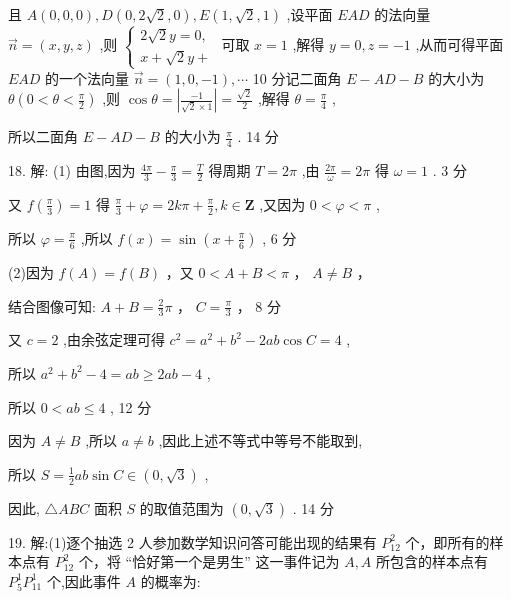 \documentclass[10pt]{article}
\begin{document}
且 \(A\left( {0,0,0}\right) ,D\left( {0,2\sqrt{2},0}\right) ,E\left( {1,\sqrt{2},1}\right)\) ,设平面 \({EAD}\) 的法向量 \(\overrightarrow{n} = \left( {x,y,z}\right)\) ,则 \(\left\{  \begin{array}{l} 2\sqrt{2}y = 0, \\  x + \sqrt{2}y +  \end{array}\right.\) 可取 \(x = 1\) ,解得 \(y = 0,z =  - 1\) ,从而可得平面 \({EAD}\) 的一个法向量 \(\overrightarrow{n} = \left( {1,0, - 1}\right) ,\cdots\) 10 分记二面角 \(E - {AD} - B\) 的大小为 \(\theta \left( {0 < \theta  < \frac{\pi }{2}}\right)\) ,则 \(\cos \theta  = \left| \frac{-1}{\sqrt{2} \times  1}\right|  = \frac{\sqrt{2}}{2}\) ,解得 \(\theta  = \frac{\pi }{4}\) ,

所以二面角 \(E - {AD} - B\) 的大小为 \(\frac{\pi }{4}\) . 14 分

18. 解: (1) 由图,因为 \(\frac{4\pi }{3} - \frac{\pi }{3} = \frac{T}{2}\) 得周期 \(T = {2\pi }\) ,由 \(\frac{2\pi }{\omega } = {2\pi }\) 得 \(\omega  = 1\) . 3 分

又 \(f\left( \frac{\pi }{3}\right)  = 1\) 得 \(\frac{\pi }{3} + \varphi  = {2k\pi } + \frac{\pi }{2},k \in  \mathbf{Z}\) ,又因为 \(0 < \varphi  < \pi\) ,

所以 \(\varphi  = \frac{\pi }{6}\) ,所以 \(f\left( x\right)  = \sin \left( {x + \frac{\pi }{6}}\right)\) , 6 分

(2)因为 \(f\left( A\right)  = f\left( B\right)\) ，又 \(0 < A + B < \pi\) ， \(A \neq  B\) ，

结合图像可知: \(A + B = \frac{2}{3}\pi\) ， \(C = \frac{\pi }{3}\) ， 8 分

又 \(c = 2\) ,由余弦定理可得 \({c}^{2} = {a}^{2} + {b}^{2} - {2ab}\cos C = 4\) ,

所以 \({a}^{2} + {b}^{2} - 4 = {ab} \geq  {2ab} - 4\) ,

所以 \(0 < {ab} \leq  4\) , 12 分

因为 \(A \neq  B\) ,所以 \(a \neq  b\) ,因此上述不等式中等号不能取到,

所以 \(S = \frac{1}{2}{ab}\sin C \in  \left( {0,\sqrt{3}}\right)\) ,

因此, \(\bigtriangleup {ABC}\) 面积 \(S\) 的取值范围为 \(\left( {0,\sqrt{3}}\right)\) . 14 分

19. 解:(1)逐个抽选 2 人参加数学知识问答可能出现的结果有 \({P}_{12}^{2}\) 个，即所有的样本点有 \({P}_{12}^{2}\) 个，将 “恰好第一个是男生” 这一事件记为 \(A,A\) 所包含的样本点有 \({P}_{5}^{1}{P}_{11}^{1}\) 个,因此事件 \(A\) 的概率为:
\end{document}
